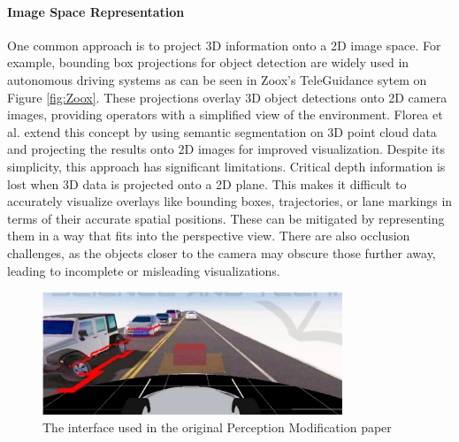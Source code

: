 \paragraph{Image Space Representation} One common approach is to project 3D information onto a
2D image space. For example, bounding box projections for object detection are
widely used in autonomous driving systems as can be seen in Zoox's TeleGuidance sytem
on Figure \ref{fig:Zoox}. These projections overlay 3D object
detections onto 2D camera images, providing operators with a simplified view of
the environment. Florea et al. \cite{Florea} extend this concept by using semantic segmentation on
3D point cloud data and projecting the results onto 2D images for improved
visualization. Despite its simplicity, this approach has significant limitations.
Critical depth information is lost when 3D data is projected onto a 2D plane. This makes
it difficult to accurately visualize overlays like bounding boxes, trajectories, or
lane markings in terms of their accurate spatial positions. These can be mitigated by
representing them in a way that fits into the perspective view. There are also occlusion
challenges, as the objects closer to the camera may obscure those further away, leading
to incomplete or misleading visualizations.

\begin{figure}
    \includegraphics[width=0.8\textwidth]{figures/perceptionMod.png}
    \centering
    \caption{The interface used in the original Perception Modification paper \cite{Feiler2021ThePM}}
    \label{fig:PerceptionMod}
\end{figure}
